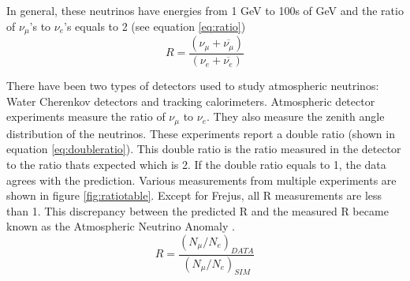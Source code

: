 In general, these neutrinos have energies from 1 GeV to 100s of GeV and the ratio of $\nu_{\mu}$'s to $\nu_{e}$'s equals to 2 (see equation \ref{eq:ratio})
\begin{equation}
\label{eq:ratio}
R = \frac{(\nu_{\mu} + \overline{\nu_{\mu}})}{(\nu_{e} + \overline{\nu_{e}})}
\end{equation} 


There have been two types of detectors used to study atmospheric neutrinos: Water Cherenkov detectors and tracking calorimeters. Atmospheric detector experiments measure the ratio of $\nu_{\mu}$ to $\nu_{e}$. They also measure the zenith angle distribution of the neutrinos. These experiments report a double ratio (shown in equation \ref{eq:doubleratio}). This double ratio is the ratio measured in the detector to the ratio thats expected which is 2. If the double ratio equals to 1, the data agrees with the prediction. Various measurements from multiple experiments are shown in figure \ref{fig:ratiotable}. Except for Frejus, all R measurements are less than 1. This discrepancy between the predicted R and the measured R became known as the Atmospheric Neutrino Anomaly \cite{superk}.
\begin{equation}
\label{eq:doubleratio}
R = \frac{(N_{\mu}/N_{e})_{DATA}}{(N_{\mu}/N_{e})_{SIM}}
\end{equation}

\begin{table}[htp!]
\centering
\caption{Measurments of the double ratio for various atmospheric neutrino experiments}
\label{fig:ratiotable}
\end{table}


